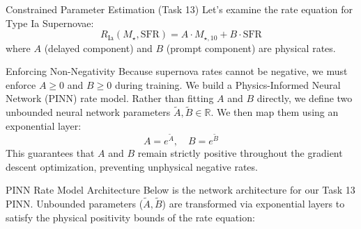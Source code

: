 \documentclass[9pt]{beamer}
\begin{document}
\begin{frame}{Constrained Parameter Estimation (Task 13)}
  Let's examine the rate equation for Type Ia Supernovae:
  $$R_{\text{Ia}}(M_\star, \text{SFR}) = A \cdot M_{\star, 10} + B \cdot \text{SFR}$$
  where $A$ (delayed component) and $B$ (prompt component) are physical rates.
  \begin{block}{Enforcing Non-Negativity}
    Because supernova rates cannot be negative, we must enforce $A \ge 0$ and $B \ge 0$ during training.
    We build a Physics-Informed Neural Network (PINN) rate model. Rather than fitting $A$ and $B$ directly, we define two unbounded neural network parameters $\tilde{A}, \tilde{B} \in \mathbb{R}$. We then map them using an exponential layer:
    $$A = e^{\tilde{A}}, \quad B = e^{\tilde{B}}$$
    This guarantees that $A$ and $B$ remain strictly positive throughout the gradient descent optimization, preventing unphysical negative rates.
  \end{block}
\end{frame}

\begin{frame}{PINN Rate Model Architecture}
  Below is the network architecture for our Task 13 PINN. Unbounded parameters ($\tilde{A}, \tilde{B}$) are transformed via exponential layers to satisfy the physical positivity bounds of the rate equation:
  \vfill
  \centering
  \vfill
\end{frame}
\end{document}
